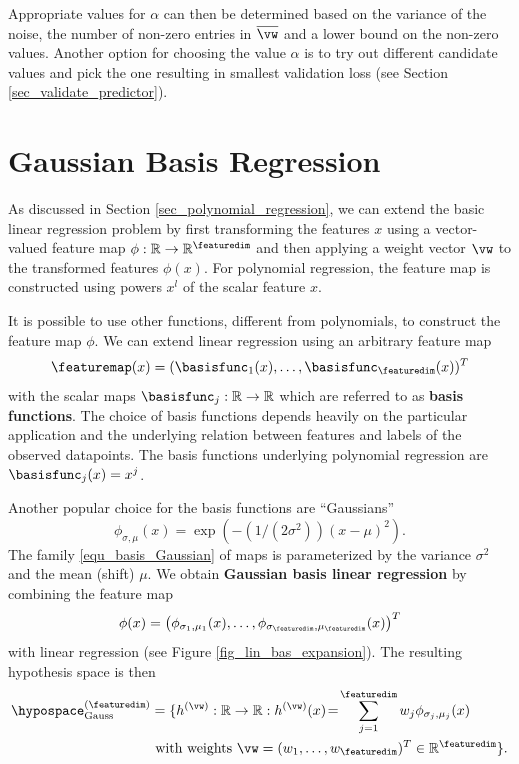 \documentclass[12pt]{report}
\begin{document}
Appropriate values for $\alpha$ can then be determined based 
on the variance of the noise, the number of non-zero entries in 
$\overline{\vw}$ and a lower bound on the non-zero values. 
Another option for choosing the value $\alpha$ is to try out different 
candidate values and pick the one resulting in smallest validation 
loss (see Section \ref{sec_validate_predictor}). 


\section{Gaussian Basis Regression}
\label{sec_linbasreg}
As discussed in Section \ref{sec_polynomial_regression}, we can 
extend the basic linear regression problem by first transforming 
the features $x$ using a vector-valued feature map $\phi: \mathbb{R} \rightarrow \mathbb{R}^{\featuredim}$ 
and then applying a weight vector $\vw$ to the transformed 
features $\phi(x)$. For polynomial regression, the feature map 
is constructed using powers $x^{l}$ of the scalar feature $x$. 

It is possible to use other functions, different from polynomials, 
to construct the feature map $\phi$. We can extend linear regression 
using an arbitrary feature map 
\begin{equation} 
\featuremap(x) = (\basisfunc_{1}(x),\ldots,\basisfunc_{\featuredim}(x))^{T}  
\end{equation} 
with the scalar maps $\basisfunc_{j}: \mathbb{R} \rightarrow \mathbb{R}$ which 
are referred to as {\bf basis functions}. The choice of basis functions 
depends heavily on the particular application and the underlying relation 
between features and labels of the observed datapoints. The basis 
functions underlying polynomial regression are $\basisfunc_{j}(x)= x^{j}$. 

Another popular choice for the basis functions are ``Gaussians'' 
\begin{equation} 
\label{equ_basis_Gaussian}
\phi_{\sigma,\mu}(x) = \exp(-(1/(2\sigma^{2})) (x\!-\!\mu)^{2}). 
\end{equation}
The family \eqref{equ_basis_Gaussian} of maps is parameterized by 
the variance $\sigma^{2}$ and the mean (shift) $\mu$. We obtain 
{\bf Gaussian basis linear regression} by combining 
the feature map 
\begin{equation} 
\phi(x) = \big (\phi_{\sigma_{1},\mu_{1}}(x) ,\ldots,\phi_{\sigma_{\featuredim},\mu_{\featuredim}}(x) \big)^{T} 
\end{equation}
with linear regression (see Figure \ref{fig_lin_bas_expansion}). The resulting hypothesis space is then
\begin{align}
\label{equ_def_Gauss_hypospace}
\hypospace^{(\featuredim)}_{\rm Gauss} & = \{ h^{(\vw)}: \mathbb{R} \rightarrow \mathbb{R}: h^{(\vw)}(x)\!=\!\sum_{j=1}^{\featuredim}  w_{j}\phi_{\sigma_{j},\mu_{j}}(x) \nonumber \\
& \mbox{ with weights } \vw=(w_{1},\ldots,w_{\featuredim})^{T} \in \mathbb{R}^{\featuredim}\}.
\end{align}
\end{document}
